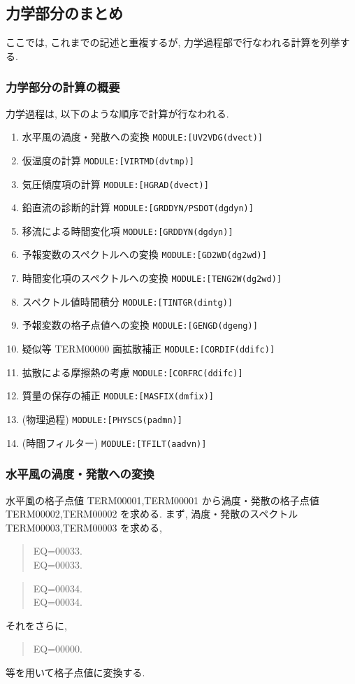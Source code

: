 ﻿
\subsection{力学部分のまとめ}

ここでは, これまでの記述と重複するが,
力学過程部で行なわれる計算を列挙する.

\subsubsection{力学部分の計算の概要}

力学過程は, 以下のような順序で計算が行なわれる.

\begin{enumerate}
\item 水平風の渦度・発散への変換   \texttt{MODULE:[UV2VDG(dvect)]}
\item 仮温度の計算              \texttt{MODULE:[VIRTMD(dvtmp)]}
\item 気圧傾度項の計算           \texttt{MODULE:[HGRAD(dvect)]}
\item 鉛直流の診断的計算         \texttt{MODULE:[GRDDYN/PSDOT(dgdyn)]}
\item 移流による時間変化項 \texttt{MODULE:[GRDDYN(dgdyn)]}
\item 予報変数のスペクトルへの変換 \texttt{MODULE:[GD2WD(dg2wd)]}
\item 時間変化項のスペクトルへの変換 \texttt{MODULE:[TENG2W(dg2wd)]}
\item スペクトル値時間積分 \texttt{MODULE:[TINTGR(dintg)]}
\item 予報変数の格子点値への変換 \texttt{MODULE:[GENGD(dgeng)]}
\item 疑似等 TERM00000 面拡散補正   \texttt{MODULE:[CORDIF(ddifc)]}
\item 拡散による摩擦熱の考慮    \texttt{MODULE:[CORFRC(ddifc)]}
\item 質量の保存の補正          \texttt{MODULE:[MASFIX(dmfix)]}
\item (物理過程)             \texttt{MODULE:[PHYSCS(padmn)]}
\item (時間フィルター)        \texttt{MODULE:[TFILT(aadvn)]}
\end{enumerate}

\subsubsection{水平風の渦度・発散への変換}

水平風の格子点値 TERM00001,TERM00001 
から渦度・発散の格子点値 TERM00002,TERM00002 を求める.
まず, 渦度・発散のスペクトル
TERM00003,TERM00003 を求める,
\begin{quote}
\nonumber
EQ=00033.\\
\label{d-summ:uv-zeta}
EQ=00033.
\end{quote}
\begin{quote}
\nonumber
EQ=00034.\\
\label{d-summ:uv-D}
EQ=00034.
\end{quote}
それをさらに, 
\begin{quote}
EQ=00000.
\end{quote}
等を用いて格子点値に変換する.

